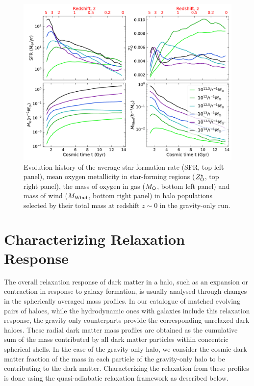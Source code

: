 \begin{figure}[htbp]
\centering
\includegraphics[width=\linewidth]{plots/dynam_relxn/hal_gal_props_evolve.pdf}
\caption{Evolution history of the average star formation rate (SFR, top left panel), mean oxygen metallicity in star-forming regions ($Z^{\star}_{\rm{O}}$, top right panel), the mass of oxygen in gas ($M_{\rm{O}}$, bottom left panel) and mass of wind ($M_{\rm{Wind}}$, bottom right panel) in halo populations selected by their total mass at redshift $z\sim 0$ in the gravity-only run.}
\label{fig:evolution-hal-gal-props}
\end{figure}

\section{Characterizing Relaxation Response}
\label{sec:methods-relchar}
The overall relaxation response of dark matter in a halo, such as an expansion or contraction in response to galaxy formation, is usually analysed through changes in the spherically averaged mass profiles. In our catalogue of matched evolving pairs of haloes, while the hydrodynamic ones with galaxies include this relaxation response, the gravity-only counterparts provide the corresponding unrelaxed dark haloes. These radial dark matter mass profiles are obtained as the cumulative sum of the mass contributed by all dark matter particles within concentric spherical shells. In the case of the gravity-only halo, we consider the cosmic dark matter fraction of the mass in each particle of the gravity-only halo to be contributing to the dark matter. Characterizing the relaxation from these profiles is done using the quasi-adiabatic relaxation framework as described below.


